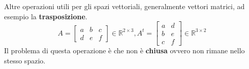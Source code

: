 Altre operazioni utili per gli spazi vettoriali, generalmente vettori matrici, ad esempio
la \textbf{trasposizione}.
\begin{equation}
    A=\left[\begin{array}{ccc}
            a & b & c \\
            d & e & f
        \end{array}\right]\in \mathbb{R}^{2\times3},  A^t = \left[\begin{array}{cc}
            a & d \\
            b & e \\
            c & f
        \end{array}\right]\in \mathbb{R}^{3\times2}
\end{equation}
Il problema di questa operazione è che non è \textbf{chiusa} ovvero non rimane
nello stesso spazio.

